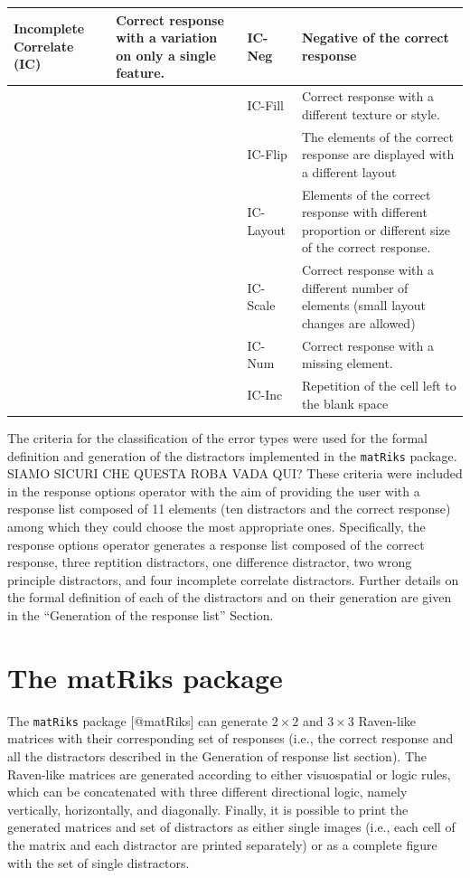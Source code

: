 \begin{table}
\begin{tabular}[t]{>{}l|l|l|l}
\hline
\textbf{Incomplete Correlate (IC)} & Correct response with a variation on only a single feature. & IC-Neg & Negative of the correct response\\
\hline
\textbf{} &  & IC-Fill & Correct response with a different texture or style.\\
\hline
\textbf{} &  & IC-Flip & The elements of the correct response are displayed with a different layout\\
\hline
\textbf{} &  & IC-Layout & Elements of the correct response with different proportion or different size of the correct response.\\
\hline
\textbf{} &  & IC-Scale & Correct response with a different number of elements (small layout changes are allowed)\\
\hline
\textbf{} &  & IC-Num & Correct response with a missing element.\\
\hline
\textbf{} &  & IC-Inc & Repetition of the cell left to the blank space\\
\hline
\end{tabular}
\end{table}

The criteria for the classification of the error types were used for the formal definition and generation of the distractors implemented in the \texttt{matRiks} package.
SIAMO SICURI CHE QUESTA ROBA VADA QUI?
These criteria were included in the response options operator with the aim of providing the user with a response list composed of 11 elements (ten distractors and the correct response) among which they could choose the most appropriate ones.
Specifically, the response options operator generates a response list composed of the correct response, three reptition distractors, one difference distractor, two wrong principle distractors, and four incomplete correlate distractors.
Further details on the formal definition of each of the distractors and on their generation are given in the ``Generation of the response list'' Section.

\section{The matRiks package}\label{the-matriks-package}

The \texttt{matRiks} package {[}@matRiks{]} can generate \(2 \times 2\) and \(3 \times 3\) Raven-like matrices with their corresponding set of responses (i.e., the correct response and all the distractors described in the Generation of response list section).
The Raven-like matrices are generated according to either visuospatial or logic rules, which can be concatenated with three different directional logic, namely vertically, horizontally, and diagonally.
Finally, it is possible to print the generated matrices and set of distractors as either single images (i.e., each cell of the matrix and each distractor are printed separately) or as a complete figure with the set of single distractors.

